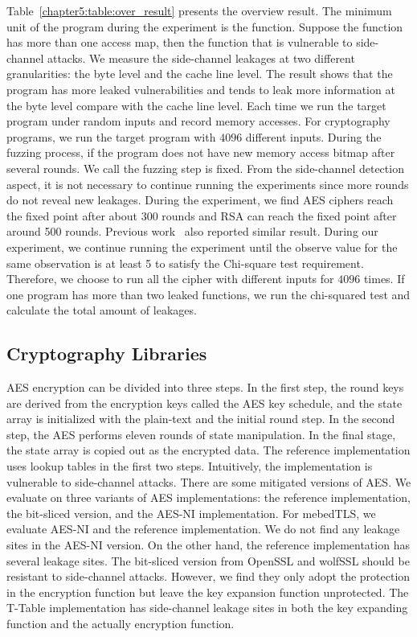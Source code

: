 Table~\ref{chapter5:table:over_result} presents the overview result. The minimum unit of the program during the experiment is the function. Suppose the function has more than one access map, then the function that is vulnerable to side-channel attacks. We measure the side-channel leakages at two different granularities: the byte level and the cache line level. The result shows that the program has more leaked vulnerabilities and tends to leak more information at the byte level compare with the cache line level. Each time we run the target program under random inputs and record memory accesses. For cryptography programs, we run the target program with $4096$ different inputs. During the fuzzing process, if the program does not have new memory access bitmap after several rounds. We call the fuzzing step is fixed. From the side-channel detection aspect, it is not necessary to continue running the experiments since more rounds do not reveal new leakages. During the experiment, we find AES ciphers reach the fixed point after about 300 rounds and RSA can reach the fixed point after around 500 rounds. Previous work~\cite{217537} also reported similar result. During our experiment, we continue running the experiment until the observe value for the same observation is at least 5 to satisfy the Chi-square test requirement. Therefore, we choose to run all the cipher with different inputs for $4096$ times.  If one program has more than two leaked functions, we run the chi-squared test and calculate the total amount of leakages.



\subsection{Cryptography Libraries}
AES encryption can be divided into three steps. In the first step, the round keys are derived from the encryption keys called the AES key schedule, and the state array is initialized with the plain-text and the initial round step. In the second step, the AES performs eleven rounds of state manipulation. In the final stage, the state array is copied out as the encrypted data.
The reference implementation uses lookup tables in the first two steps. Intuitively, the implementation is vulnerable to side-channel attacks. There are some mitigated versions of AES. We evaluate \ctool{} on three variants of AES implementations: the reference implementation, the bit-sliced version, and the AES-NI implementation.
For mebedTLS, we evaluate AES-NI and the reference implementation. We do not find any leakage sites in the AES-NI version. On the other hand, the reference implementation has several leakage sites. The bit-sliced version from OpenSSL and wolfSSL should be resistant to side-channel attacks. However, we find they only adopt the protection in the encryption function but leave the key expansion function unprotected. The T-Table implementation has side-channel leakage sites in both the key expanding function and the actually encryption function. 

